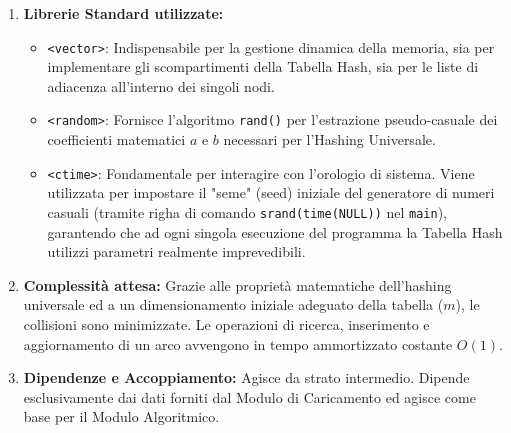 \documentclass[12pt, a4paper]{article}
\begin{document}
\begin{enumerate}
\begin{itemize}
        Le due funzioni \texttt{get\_nodo} e \texttt{aggiungi\_arco} sono i metodi che si occupano della costruzione effettiva del Grafo. 
        \item[-] Una volta che il Modulo di Caricamento ha estratto con successo la coppia di nodi $u$ e $v$ dal file testuale, esegue direttamente la chiamata \texttt{grafo.aggiungi\_arco(u, v)}. È esattamente attraverso questa istruzione che i due moduli comunicano: il primo estrae i dati in sequenza, il secondo li riceve e li organizza. In questo modo il grafo viene fisicamente costruito passo dopo passo.
        \item[-] \texttt{Inizializzazione nel \texttt{main}:} All'interno del \texttt{main}, viene creato l'oggetto \texttt{grafo} della classe \texttt{GrafoHashTable} con dimensione iniziale di $m = 100000$. Immediatamente dopo, viene costruito il grafo invocando la funzione \texttt{caricaGrafoDaFile(argv[1], grafo)}, passando come argomenti il percorso del file di testo (estratto dalla riga di comando) e il riferimento all'oggetto grafo appena creato. Questa è la funzione che contiene il Modulo di Caricamento.
    \end{itemize}
    \item \textbf{Librerie Standard utilizzate:}
    \begin{itemize}
        \item[-] \texttt{<vector>}: Indispensabile per la gestione dinamica della memoria, sia per implementare gli scompartimenti della Tabella Hash, sia per le liste di adiacenza all'interno dei singoli nodi.
        \item[-] \texttt{<random>}: Fornisce l'algoritmo \texttt{rand()} per l'estrazione pseudo-casuale dei coefficienti matematici $a$ e $b$ necessari per l'Hashing Universale.
        \item[-] \texttt{<ctime>}: Fondamentale per interagire con l'orologio di sistema. Viene utilizzata per impostare il "seme" (seed) iniziale del generatore di numeri casuali (tramite righa di comando \texttt{srand(time(NULL))} nel \texttt{main}), garantendo che ad ogni singola esecuzione del programma la Tabella Hash utilizzi parametri realmente imprevedibili.
    \end{itemize}
    \item \textbf{Complessità attesa:} Grazie alle proprietà matematiche dell'hashing universale ed a un dimensionamento iniziale adeguato della tabella ($m$), le collisioni sono minimizzate. Le operazioni di ricerca, inserimento e aggiornamento di un arco avvengono in tempo ammortizzato costante $O(1)$.
    \item \textbf{Dipendenze e Accoppiamento:} Agisce da strato intermedio. Dipende esclusivamente dai dati forniti dal Modulo di Caricamento ed agisce come base per il Modulo Algoritmico.
\end{enumerate}
\end{document}
